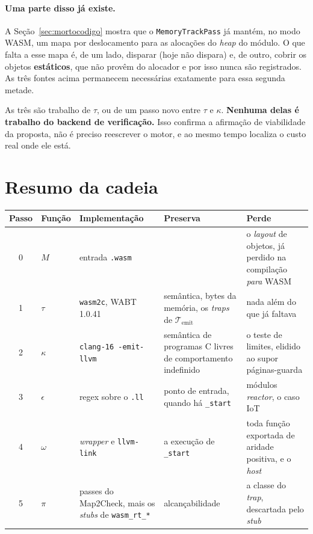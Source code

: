 \documentclass[11pt,a4paper]{article}
\theoremstyle{definition}
\newcommand{\code}[1]{\texttt{#1}}
\begin{document}
\paragraph{Uma parte disso já existe.}
A Seção~\ref{sec:mortocodigo} mostra que o \code{MemoryTrackPass} já mantém, no
modo WASM, um mapa por deslocamento para as alocações do \emph{heap} do módulo.
O que falta a esse mapa é, de um lado, disparar (hoje não dispara) e, de
outro, cobrir os objetos \textbf{estáticos}, que não provêm do alocador e por
isso nunca são registrados. As três fontes acima permanecem necessárias
exatamente para essa segunda metade.

As três são trabalho de $\tau$, ou de um passo novo entre $\tau$ e $\kappa$.
\textbf{Nenhuma delas é trabalho do backend de verificação.} Isso confirma a
afirmação de viabilidade da proposta, não é preciso reescrever o motor, e ao
mesmo tempo localiza o custo real onde ele está.

\section{Resumo da cadeia}

\begin{table}[h]
\centering
\footnotesize
\renewcommand{\arraystretch}{1.25}
\begin{tabularx}{\textwidth}{@{}c l X X X@{}}
\toprule
\textbf{Passo} & \textbf{Função} & \textbf{Implementação} &
\textbf{Preserva} & \textbf{Perde} \\
\midrule
0 & $M$ & entrada \code{.wasm} &  &
  o \emph{layout} de objetos, já perdido na compilação \emph{para} WASM \\
1 & $\tau$ & \code{wasm2c}, WABT 1.0.41 &
  semântica, bytes da memória, os \emph{traps} de
  $\mathcal{T}_{\mathrm{emit}}$ & nada além do que já faltava \\
2 & $\kappa$ & \code{clang-16 -emit-llvm} &
  semântica de programas C livres de comportamento indefinido &
  o teste de limites, elidido ao supor páginas-guarda \\
3 & $\epsilon$ & regex sobre o \code{.ll} &
  ponto de entrada, quando há \code{\_start} & módulos \emph{reactor}, o caso IoT \\
4 & $\omega$ & \emph{wrapper} e \code{llvm-link} &
  a execução de \code{\_start} &
  toda função exportada de aridade positiva, e o \emph{host} \\
5 & $\pi$ & passes do Map2Check, mais os \emph{stubs} de \code{wasm\_rt\_*} &
  alcançabilidade & a classe do \emph{trap}, descartada pelo \emph{stub} \\
\bottomrule
\end{tabularx}
\end{table}
\end{document}
